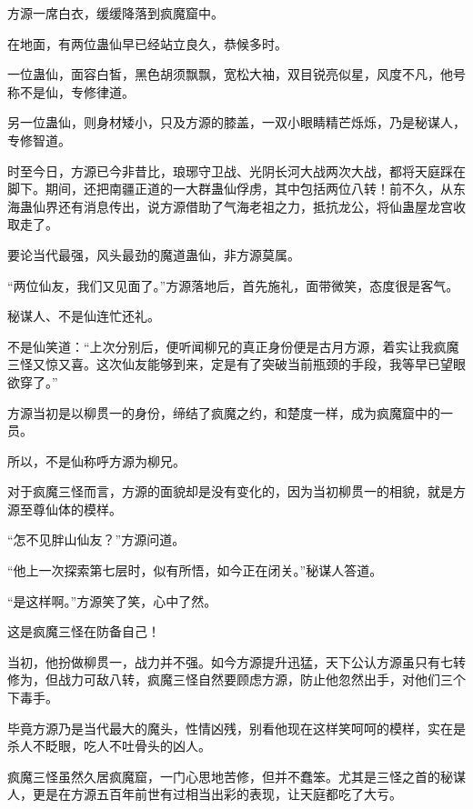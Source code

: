 
\begin{this_body}



方源一席白衣，缓缓降落到疯魔窟中。

在地面，有两位蛊仙早已经站立良久，恭候多时。

一位蛊仙，面容白皙，黑色胡须飘飘，宽松大袖，双目锐亮似星，风度不凡，他号称不是仙，专修律道。

另一位蛊仙，则身材矮小，只及方源的膝盖，一双小眼睛精芒烁烁，乃是秘谋人，专修智道。

时至今日，方源已今非昔比，琅琊守卫战、光阴长河大战两次大战，都将天庭踩在脚下。期间，还把南疆正道的一大群蛊仙俘虏，其中包括两位八转！前不久，从东海蛊仙界还有消息传出，说方源借助了气海老祖之力，抵抗龙公，将仙蛊屋龙宫收取走了。

要论当代最强，风头最劲的魔道蛊仙，非方源莫属。

“两位仙友，我们又见面了。”方源落地后，首先施礼，面带微笑，态度很是客气。

秘谋人、不是仙连忙还礼。

不是仙笑道：“上次分别后，便听闻柳兄的真正身份便是古月方源，着实让我疯魔三怪又惊又喜。这次仙友能够到来，定是有了突破当前瓶颈的手段，我等早已望眼欲穿了。”

方源当初是以柳贯一的身份，缔结了疯魔之约，和楚度一样，成为疯魔窟中的一员。

所以，不是仙称呼方源为柳兄。

对于疯魔三怪而言，方源的面貌却是没有变化的，因为当初柳贯一的相貌，就是方源至尊仙体的模样。

“怎不见胖山仙友？”方源问道。

“他上一次探索第七层时，似有所悟，如今正在闭关。”秘谋人答道。

“是这样啊。”方源笑了笑，心中了然。

这是疯魔三怪在防备自己！

当初，他扮做柳贯一，战力并不强。如今方源提升迅猛，天下公认方源虽只有七转修为，但战力可敌八转，疯魔三怪自然要顾虑方源，防止他忽然出手，对他们三个下毒手。

毕竟方源乃是当代最大的魔头，性情凶残，别看他现在这样笑呵呵的模样，实在是杀人不眨眼，吃人不吐骨头的凶人。

疯魔三怪虽然久居疯魔窟，一门心思地苦修，但并不蠢笨。尤其是三怪之首的秘谋人，更是在方源五百年前世有过相当出彩的表现，让天庭都吃了大亏。


\end{this_body}
